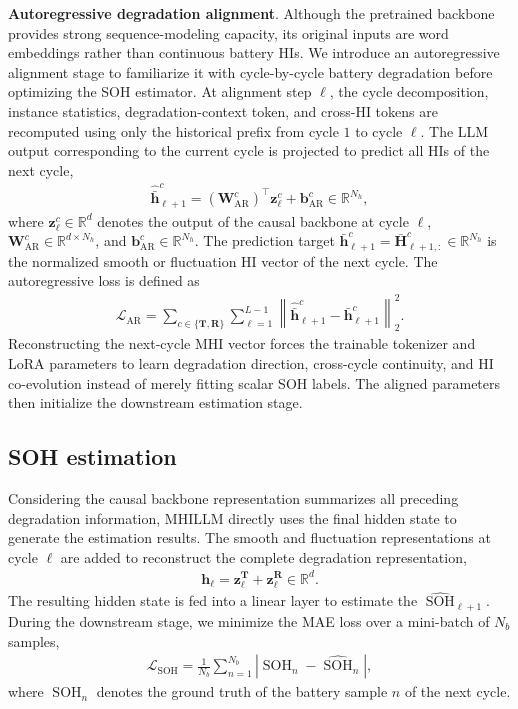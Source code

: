 \documentclass[preprint,12pt]{elsarticle}
\begin{document}
\textbf{Autoregressive degradation alignment}.
Although the pretrained backbone provides strong sequence-modeling capacity, its original inputs are word embeddings rather than continuous battery HIs. We introduce an autoregressive alignment stage to familiarize it with cycle-by-cycle battery degradation before optimizing the SOH estimator. At alignment step $\ell$, the cycle decomposition, instance statistics, degradation-context token, and cross-HI tokens are recomputed using only the historical prefix from cycle $1$ to cycle $\ell$. The LLM output corresponding to the current cycle is projected to predict all HIs of the next cycle,
\begin{gather}
\widehat{\bar{\mathbf{h}}}_{\ell+1}^{c}
=(\mathbf{W}_{\mathrm{AR}}^{c})^{\top}\mathbf{z}_{\ell}^{c}
+\mathbf{b}_{\mathrm{AR}}^{c}
\in\mathbb{R}^{N_h},
\end{gather}
where $\mathbf{z}_{\ell}^{c}\in\mathbb{R}^{d}$ denotes the output of the causal backbone at cycle $\ell$, $\mathbf{W}_{\mathrm{AR}}^{c}\in\mathbb{R}^{d\times N_h}$, and $\mathbf{b}_{\mathrm{AR}}^{c}\in\mathbb{R}^{N_h}$. The prediction target $\bar{\mathbf{h}}_{\ell+1}^{c}=\bar{\mathbf{H}}_{\ell+1,:}^{c}\in\mathbb{R}^{N_h}$ is the normalized smooth or fluctuation HI vector of the next cycle. The autoregressive loss is defined as
\begin{gather}
\mathcal{L}_{\mathrm{AR}}
=
\sum_{c\in\{\mathbf{T},\mathbf{R}\}}
\sum_{\ell=1}^{L-1}
\left\|
\widehat{\bar{\mathbf{h}}}_{\ell+1}^{c}
-\bar{\mathbf{h}}_{\ell+1}^{c}
\right\|_{2}^{2}.
\end{gather}
 Reconstructing the next-cycle MHI vector forces the trainable tokenizer and LoRA parameters to learn degradation direction, cross-cycle continuity, and HI co-evolution instead of merely fitting scalar SOH labels. The aligned parameters then initialize the downstream estimation stage.

\subsection{SOH estimation}

Considering the causal backbone representation summarizes all preceding degradation information, MHILLM directly uses the final hidden state to generate the estimation results. The smooth and fluctuation representations at cycle $\ell$ are added to reconstruct the complete degradation representation,
\begin{gather}
\mathbf{h}_{\ell}=\mathbf{z}_{\ell}^{\mathbf{T}}+\mathbf{z}_{\ell}^{\mathbf{R}}\in\mathbb{R}^{d}.
\end{gather}
The resulting hidden state is fed into a linear layer to estimate the $\widehat{\operatorname{SOH}}_{\ell+1}$. During the downstream stage, we minimize the MAE loss over a mini-batch of $N_b$ samples,
\begin{gather}
\mathcal{L}_{\mathrm{SOH}}=\frac{1}{N_b}\sum_{n=1}^{N_b}\left|\operatorname{SOH}_{n}-\widehat{\operatorname{SOH}}_{n}\right|,
\end{gather}
where $\operatorname{SOH}_{n}$ denotes the ground truth of the battery sample $n$ of the next cycle.
\end{document}
